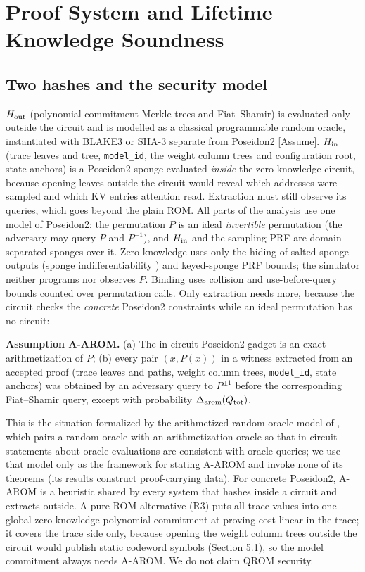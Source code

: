 \documentclass[10pt]{article}
\begin{document}
\section{Proof System and Lifetime Knowledge Soundness}
\subsection{Two hashes and the security model}
$H_{\rm out}$ (polynomial-commitment Merkle trees and Fiat--Shamir) is evaluated only outside the circuit and is modelled as a classical programmable random oracle, instantiated with BLAKE3 or SHA-3 separate from Poseidon2 [Assume]. $H_{\rm in}$ (trace leaves and tree, \texttt{model\_\allowbreak{}id}, the weight column trees and configuration root, state anchors) is a Poseidon2 sponge evaluated \emph{inside} the zero-knowledge circuit, because opening leaves outside the circuit would reveal which addresses were sampled and which KV entries attention read. Extraction must still observe its queries, which goes beyond the plain ROM. All parts of the analysis use one model of Poseidon2: the permutation $P$ is an ideal \emph{invertible} permutation (the adversary may query $P$ and $P^{-1}$), and $H_{\rm in}$ and the sampling PRF are domain-separated sponges over it. Zero knowledge uses only the hiding of salted sponge outputs (sponge indifferentiability \cite{BDPV08}) and keyed-sponge PRF bounds; the simulator neither programs nor observes $P$. Binding uses collision and use-before-query bounds counted over permutation calls. Only extraction needs more, because the circuit checks the \emph{concrete} Poseidon2 constraints while an ideal permutation has no circuit:

\textbf{Assumption A-AROM.} (a) The in-circuit Poseidon2 gadget is an exact arithmetization of $P$; (b) every pair $(x,P(x))$ in a witness extracted from an accepted proof (trace leaves and paths, weight column trees, \texttt{model\_\allowbreak{}id}, state anchors) was obtained by an adversary query to $P^{\pm1}$ before the corresponding Fiat--Shamir query, except with probability $\Delta_{\rm arom}(Q_{\rm tot})$.

This is the situation formalized by the arithmetized random oracle model of \cite{CCGOS23}, which pairs a random oracle with an arithmetization oracle so that in-circuit statements about oracle evaluations are consistent with oracle queries; we use that model only as the framework for stating A-AROM and invoke none of its theorems (its results construct proof-carrying data). For concrete Poseidon2, A-AROM is a heuristic shared by every system that hashes inside a circuit and extracts outside. A pure-ROM alternative (R3) puts all trace values into one global zero-knowledge polynomial commitment at proving cost linear in the trace; it covers the trace side only, because opening the weight column trees outside the circuit would publish static codeword symbols (Section 5.1), so the model commitment always needs A-AROM. We do not claim QROM security.
\end{document}
